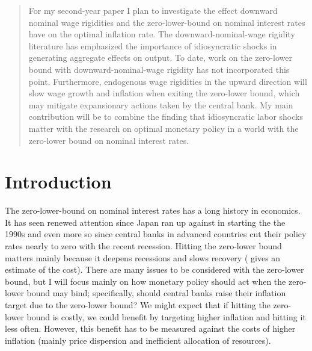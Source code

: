 \documentclass[12pt,a4paper]{article}            %
\begin{document}



\begin{abstract}
For my second-year paper I plan to investigate the effect downward nominal wage rigidities and the zero-lower-bound on nominal interest rates have on the optimal inflation rate.
The downward-nominal-wage rigidity literature has emphasized the importance of idiosyncratic shocks in generating aggregate effects on output.
To date, work on the zero-lower bound with downward-nominal-wage rigidity has not incorporated this point.
Furthermore, endogenous wage rigidities in the upward direction will slow wage growth and inflation when exiting the zero-lower bound, which may mitigate expansionary actions taken by the central bank.
My main contribution will be to combine the finding that idiosyncratic labor shocks matter with the research on optimal monetary policy in a world with the zero-lower bound on nominal interest rates.
\end{abstract}
\newpage
\section{Introduction}
\label{sec:introduction}

The zero-lower-bound on nominal interest rates has a long history in economics. It has seen renewed attention since Japan ran up against in starting the the 1990s and even more so since central banks in advanced countries cut their policy rates nearly to zero with the recent recession.
Hitting the zero-lower bound matters mainly because it deepens recessions and slows recovery (\cite{williams_2009} gives an estimate of the cost).
There are many issues to be considered with the zero-lower bound, but I will focus mainly on how monetary policy should act when the zero-lower bound may bind;
specifically, should central banks raise their inflation target due to the zero-lower bound?
We might expect that if hitting the zero-lower bound is costly, we could benefit by targeting higher inflation and hitting it less often.
However, this benefit has to be measured against the costs of higher inflation (mainly price dispersion and inefficient allocation of resources).
\end{document}
